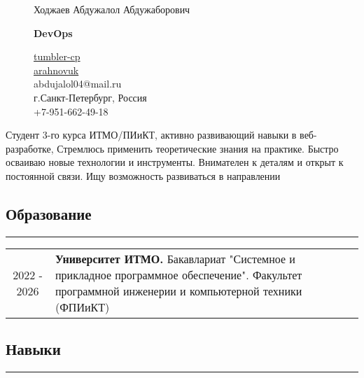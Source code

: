 \documentclass[a4paper,10pt]{article}
\begin{document}
\begin{figure}[!htb]
    \begin{minipage}{.5\textwidth}
        \begin{flushleft}
            \begin{Large}
            Ходжаев Абдужалол Абдужаборович\\
            \end{Large}
            \begin{large}
                \textbf{DevOps}
            \end{large}
        \end{flushleft}
    \end{minipage}
    \begin{minipage}{.5\textwidth}
        \begin{flushright}
            \begin{small}
                \href{https://github.com/tumbler-cp}{tumbler-cp} \faGithub\\
                \href{https://t.me/arahnovuk}{arahnovuk} \faTelegram\\
                abdujalol04@mail.ru \faAt\\
                г.Санкт-Петербург, Россия \faMapMarker\\
                +7-951-662-49-18 \faPhone
            \end{small}
        \end{flushright}
    \end{minipage}
\end{figure}
\noindent 
Студент 3-го курса 
ИТМО/ПИиКТ,
активно развивающий навыки в веб-разработке,
Стремлюсь применить теоретические знания на практике.
Быстро осваиваю новые технологии и инструменты.
Внимателен к деталям и открыт к постоянной связи. Ищу возможность развиваться в направлении\\
\subsection*{Образование}
\hrule
\vspace*{5mm}
\begin{tabular}{c | p{}}
    2022 - 2026 & \textbf{Университет ИТМО.} Бакавлариат "Системное и прикладное программное обеспечение". Факультет программной инженерии и компьютерной техники (ФПИиКТ)  \\
\end{tabular}
\subsection*{Навыки}
\hrule
\vspace*{3mm}
\end{document}
